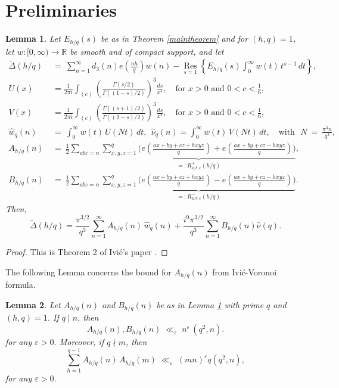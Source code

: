 \documentclass[oneside,reqno,10pt]{amsart}
\numberwithin{equation}{section}
\theoremstyle{plain}
\newtheorem{lemma}{Lemma}
\theoremstyle{definition}
\numberwithin{equation}{section}
\begin{document}
\section{Preliminaries}\label{sec:lemmas}
\begin{lemma}\label{lemma1}
    Let $E_{h/q}(s)$ be as in Theorem \ref{maintheorem} and for $(h, q) = 1$, let $w: [0,\infty) \rightarrow \mathbb{R}$ be smooth and of compact support, and let
\begin{align*}
     \tilde{\Delta}(h/q) \ &=\  \sum_{n=1}^{\infty} d_3(n) e\left( \frac{nh}{q} \right) w(n) - \underset{s=1}{\operatorname{Res}} \left\{ E_{h/q}(s) \int_0^\infty w(t)\, t^{s-1} \,dt \right\},\\
      U(x)&=\frac{1}{2\pi i} \int_{(c)}\left( \frac{\Gamma(s/2)}{\Gamma((1 - s)/2)} \right)^3 \frac{ds}{x^s}, \quad \text{for } x > 0 \text{ and } 0 < c < \frac{1}{6},\\
      V(x)&= \frac{1}{2\pi i} \int_{(c)}\left(\frac{\Gamma((s+1)/2)}{\Gamma((2-s)/2)}\right)^3 \frac{ds}{x^s}, \quad \text{for } x>0 \text{ and } 0 <c < \frac{1}{6}, \\
      \hat{w}_q(n)\  &=\  \int_0^\infty w(t)\, U(Nt)\, dt, \ \ \hat{\nu}_q(n) =\int_0^\infty w(t)\, V(Nt)\, dt,\quad \text{with}\ \ \  N \ =\  \frac{\pi^3 n}{q^3},\\
      A_{h/q}(n) \ &=\  \frac{1}{2} \sum_{abc = n} \underbrace{\sum_{x,y,z=1}^q \Biggl(e\left( \frac{ax+by+cz+hxyz}{q} \right) + e\left( \frac{ax+by+cz-hxyz}{q} \right)\Biggr)}_{=: R^{+}_{a,b,c}(h/q)},\\
       B_{h/q}(n) \ &=\  \frac{1}{2} \sum_{abc = n} \underbrace{\sum_{x,y,z=1}^q \Biggl(e\left( \frac{ax+by+cz+hxyz}{q} \right) - e\left( \frac{ax+by+cz-hxyz}{q} \right)\Biggr)}_{=:R^{-}_{a,b,c}(h/q)}.
\end{align*}
Then,
    \begin{equation*}
        \tilde{\Delta}(h/q) = \frac{\pi^{3/2}}{q^3} \sum_{n=1}^{\infty} A_{h/q}(n)\, \hat{w}_q(n) + \frac{i^9 \pi^{3/2}}{q^3} \sum_{n=1}^{\infty} B_{h/q}(n)\hat{\nu}(q).
    \end{equation*}
\end{lemma}
\begin{proof}
    This is Theorem 2 of Ivi\'c's paper \cite{Iv}.
\end{proof}
The following Lemma concerns the bound for $A_{h/q}(n)$ from Ivić-Voronoi formula.
\begin{lemma}\label{lemma2}
    Let $A_{h/q}(n)$ and $B_{h/q}(n)$ be as in Lemma \ref{lemma1} with prime $q$ and $(h,q)=1$.  If $q\mid n$, then
    \begin{equation*}
        A_{h/q}(n),B_{h/q}(n)\;\ll_{\varepsilon}\;n^{\varepsilon}\,(q^2,n).
    \end{equation*} for any $\varepsilon>0$. Moreover, if $q\nmid m$, then
    \begin{equation*}
        \sum_{h=1}^{q-1}A_{h/q}(n)\,\overline{A_{h/q}(m)}\;\ll_{\varepsilon}\;(mn)^{\varepsilon}q(q^2,n),
    \end{equation*} for any $\varepsilon>0$.
\end{lemma}
\end{document}
